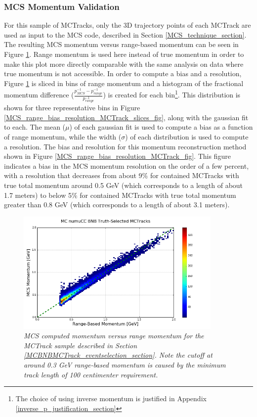 \subsubsection{MCS Momentum Validation}\label{MCS_Momentum_Validation_MCTrack_section}
For this sample of {\sc MCTracks}, only the 3D trajectory points of each {\sc MCTrack} are used as input to the MCS code, described in Section \ref{MCS_technique_section}. The resulting MCS momentum versus range-based momentum can be seen in Figure \ref{MCS_range_momentum_MCTrack_fig}. Range momentum is used here instead of true momentum in order to make this plot more directly comparable with the same analysis on data where true momentum is not accessible. In order to compute a bias and a resolution, Figure \ref{MCS_range_momentum_MCTrack_fig} is sliced in bins of range momentum and a histogram of the fractional momentum difference ($\frac{p_{MCS}^{-1} - p_{range}^{-1}}{p_{range}^{-1}}$) is created for each bin\footnote{The choice of using inverse momentum is justified in Appendix \ref{inverse_p_justification_section}}. This distribution is shown for three representative bins in Figure \ref{MCS_range_bias_resolution_MCTrack_slices_fig}, along with the gaussian fit to each.  The mean ($\mu$) of each gaussian fit is used to compute a bias as a function of range momentum, while the width ($\sigma$) of each distribution is used to compute a resolution. The bias and resolution for this momentum reconstruction method shown in Figure \ref{MCS_range_bias_resolution_MCTrack_fig}. This figure indicates a bias in the MCS momentum resolution on the order of a few percent, with a resolution that decreases from about 9\% for contained {\sc MCTracks} with true total momentum around 0.5 GeV (which corresponds to a length of about 1.7 meters) to below 5\% for contained {\sc MCTracks} with true total momentum greater than 0.8 GeV (which corresponds to a length of about 3.1 meters).


\begin{figure}[ht!]
\begin{center}
\includegraphics[width=100mm]{Figures/MCS_range_comparison_MCBNBMCTrack.png}
\end{center}
\caption{\textit{MCS computed momentum versus range momentum for the {\sc MCTrack} sample described in Section \ref{MCBNBMCTrack_eventselection_section}. Note the cutoff at around 0.3 GeV range-based momentum is caused by the minimum track length of 100 centimenter requirement.}}
\label{MCS_range_momentum_MCTrack_fig}
\end{figure}


